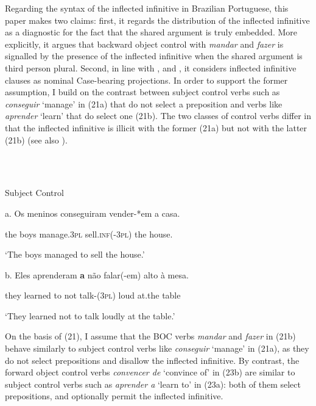 \documentclass[output=paper]{langsci/langscibook}
\begin{document}
Regarding the syntax of the inflected infinitive in Brazilian Portuguese, this paper makes two claims: first, it regards the distribution of the inflected infinitive as a diagnostic for the fact that the shared argument is truly embedded. More explicitly, it argues that backward object control with \textit{mandar} and \textit{fazer} is signalled by the presence of the inflected infinitive when the shared argument is third person plural. Second, in line with \citet{Raposo1987}, \citet{Nunes1995} and \citet{Pires2010}, it considers inflected infinitive clauses as nominal Case-bearing projections. In order to support the former assumption, I build on the contrast between subject control verbs such as \textit{conseguir} ‘manage’ in (21a) that do not select a preposition and verbs like \textit{aprender} ‘learn’ that do select one (21b). The two classes of control verbs differ in that the inflected infinitive is illicit with the former (21a) but not with the latter (21b) (see also \citealt{Modesto2010}). 

\ea%
    \label{ex:moreno:21}
    \gll\\
        \\
    \glt
    \z

          Subject Control

a.    Os meninos conseguiram   vender-*em   a casa.  

             the boys      manage.\textsc{3pl}    sell\textsc{.inf(-3pl)}  the house.

    ‘The boys managed to sell the house.’

  b.     Eles    aprenderam \textbf{a}  não   falar(-em)     alto  à        mesa.     

          they    learned        to not    talk-(\textsc{3pl})  loud at.the table  

    ‘They learned not to talk loudly at the table.’

On the basis of (21), I assume that the BOC verbs \textit{mandar} and \textit{fazer} in (21b) behave similarly to subject control verbs like \textit{conseguir} ‘manage’ in (21a), as they do not select prepositions and disallow the inflected infinitive. By contrast, the forward object control verbs \textit{convencer de} ‘convince of’ in (23b) are similar to subject control verbs such as \textit{aprender a} ‘learn to’ in (23a): both of them select prepositions, and optionally permit the inflected infinitive.

\ea%
    \label{ex:moreno:22}
    \gll\\
        \\
    \glt
    \z
\end{document}
